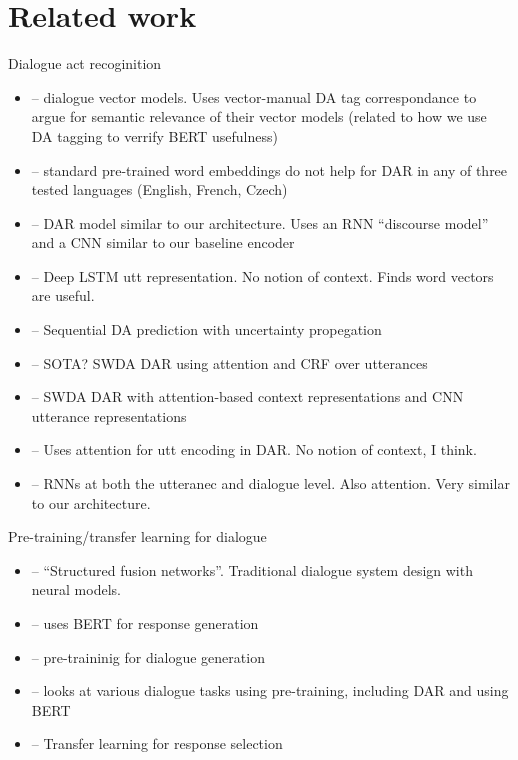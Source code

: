 \documentclass[11pt,a4paper]{article}
\begin{document}
\section{Related work} %
Dialogue act recoginition
\begin{itemize}
  \item \citet{pragstVectorRepresentationUtterances2018} -- dialogue vector models. Uses vector-manual DA tag correspondance to argue for semantic relevance of their vector models (related to how we use DA tagging to verrify BERT usefulness)
  \item \citet{cerisaraEffectsUsingWord2vec2017} -- standard pre-trained word embeddings do not help for DAR in any of three tested languages (English, French, Czech)
  \item \citet{kalchbrennerRecurrentConvolutionalNeural2013} -- DAR model similar to our architecture. Uses an RNN ``discourse model'' and a CNN similar to our baseline encoder
  \item \citet{khanpourDialogueActClassification2016} -- Deep LSTM utt representation. No notion of context. Finds word vectors are useful.
  \item \citet{tranPreservingDistributionalInformation2017} -- Sequential DA prediction with uncertainty propegation
  \item \citet{chenDialogueActRecognition2017} -- SOTA? SWDA DAR using attention and CRF over utterances
  \item \citet{ortegaNeuralbasedContextRepresentation2017} -- SWDA DAR with attention-based context representations and CNN utterance representations
  \item \citet{shenNeuralAttentionModels2016} -- Uses attention for utt encoding in DAR. No notion of context, I think.
  \item \citet{tranHierarchicalNeuralModel2017} -- RNNs at both the utteranec and dialogue level. Also attention. Very similar to our architecture.
\end{itemize}

Pre-training/transfer learning for dialogue
\begin{itemize}
  \item \citet{mehriStructuredFusionNetworks2019} -- ``Structured fusion networks''. Traditional dialogue system design with neural models.
  \item \citet{chenSemanticallyConditionedDialog2019a} -- uses BERT for response generation
  \item \citet{baoPLATOPretrainedDialogue2019} -- pre-traininig for dialogue generation
  \item \citet{mehriPretrainingMethodsDialog2019} -- looks at various dialogue tasks using pre-training, including DAR and using BERT
  \item \citet{vigComparisonTransferLearningApproaches} -- Transfer learning for response selection
\end{itemize}
\end{document}
